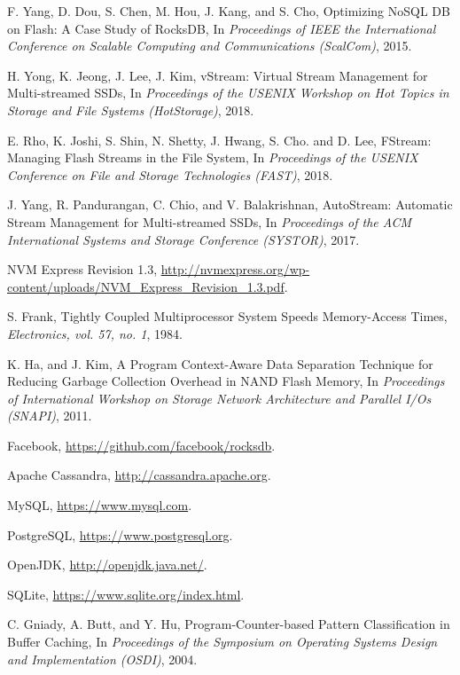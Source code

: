 \begin{thebibliography}{00}
F. Yang, D. Dou, S. Chen, M. Hou, J. Kang, and S. Cho,
Optimizing NoSQL DB on Flash: A Case Study of RocksDB,
In \textit{Proceedings of IEEE the International Conference on Scalable Computing
and Communications (ScalCom)}, 2015.

H. Yong, K. Jeong, J. Lee, J. Kim,
vStream: Virtual Stream Management for Multi-streamed SSDs,
In \textit{Proceedings of the USENIX Workshop on Hot Topics in Storage
and File Systems (HotStorage)}, 2018.

E. Rho, K. Joshi, S. Shin, N. Shetty, J. Hwang, S. Cho. and D. Lee,
FStream: Managing Flash Streams in the File System,
In \textit{Proceedings of the USENIX Conference on File and Storage Technologies (FAST)}, 2018.

J. Yang, R. Pandurangan, C. Chio, and V. Balakrishnan,
AutoStream: Automatic Stream Management for Multi-streamed SSDs,
In \textit{Proceedings of the ACM International Systems and Storage Conference (SYSTOR)}, 2017.

NVM Express Revision 1.3,
\url{http://nvmexpress.org/wp-content/uploads/NVM_Express_Revision_1.3.pdf}.

S. Frank,
Tightly Coupled Multiprocessor System Speeds Memory-Access Times,
\textit{Electronics, vol. 57, no. 1}, 1984.

K. Ha, and J. Kim,
A Program Context-Aware Data Separation Technique for Reducing Garbage Collection Overhead in NAND Flash Memory,
In \textit{Proceedings of International Workshop on Storage Network Architecture 
and Parallel I/Os (SNAPI)}, 2011.

Facebook,
\url{https://github.com/facebook/rocksdb}.

Apache Cassandra,
\url{http://cassandra.apache.org}.

MySQL,
\url{https://www.mysql.com}.

PostgreSQL,
\url{https://www.postgresql.org}.

OpenJDK,
\url{http://openjdk.java.net/}.

SQLite,
\url{https://www.sqlite.org/index.html}.

C. Gniady, A. Butt, and Y. Hu,
Program-Counter-based Pattern Classification in Buffer Caching,
In \textit{Proceedings of the Symposium on Operating Systems Design and Implementation (OSDI)}, 2004.


\end{thebibliography}
